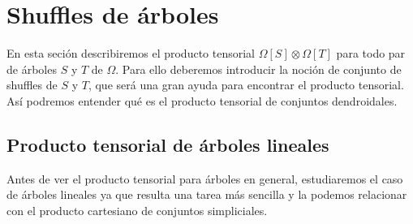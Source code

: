 \documentclass[../main.tex]{subfiles}
\begin{document}
\section{Shuffles de \'arboles}
En esta seci\'on describiremos el producto tensorial $\Omega[S]\otimes\Omega[T]$ para todo par de \'arboles $S$ y $T$ de $\Omega$. Para ello deberemos introducir la noci\'on de conjunto de shuffles de $S$ y $T$, que ser\'a una gran ayuda para encontrar el producto tensorial. As\'i podremos entender qu\'e es el producto tensorial de conjuntos dendroidales.
\subsection{Producto tensorial de \'arboles lineales}
Antes de ver el producto tensorial para \'arboles en general, estudiaremos el caso de \'arboles lineales ya que resulta una tarea m\'as sencilla y la podemos relacionar con el producto cartesiano de conjuntos simpliciales.
\end{document}
